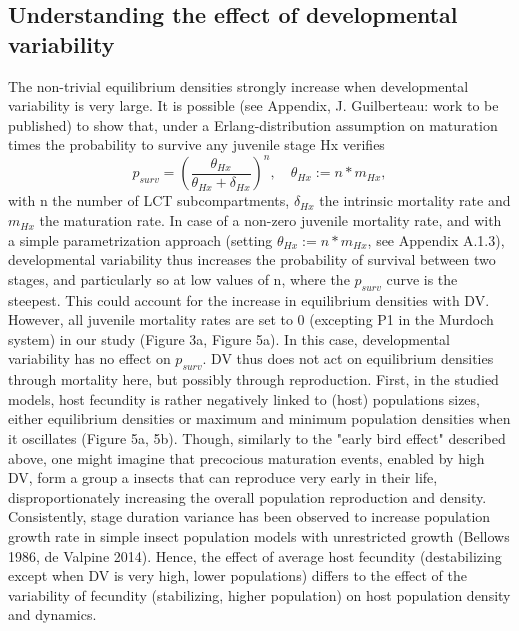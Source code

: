 \documentclass[12pt,a4paper,onecolumn]{article}
\begin{document}
\subsection{Understanding the effect of developmental variability}

\tabto{1 cm} The non-trivial equilibrium densities strongly increase when developmental variability is very large. It is possible (see Appendix, J. Guilberteau: work to be published) to show that, under a Erlang-distribution assumption on maturation times the probability to survive any juvenile stage Hx verifies
\[ p_{surv} = (\frac{\theta_{Hx}}{\theta_{Hx} + \delta_{Hx}})^n, \quad \theta_{Hx} := n*m_{Hx}, \]
with n the number of LCT subcompartments, $\delta_{Hx}$ the intrinsic mortality rate and $m_{Hx}$ the maturation rate. In case of a non-zero juvenile mortality rate, and with a simple parametrization approach (setting $\theta_{Hx} := n*m_{Hx}$, see Appendix A.1.3), developmental variability thus increases the probability of survival between two stages, and particularly so at low values of n, where the $p_{surv}$ curve is the steepest. This could account for the increase in equilibrium densities with DV. However, all juvenile mortality rates are set to 0 (excepting P1 in the Murdoch system) in our study (Figure 3a, Figure 5a). In this case, developmental variability has no effect on $p_{surv}$. DV thus does not act on equilibrium densities through mortality here, but possibly through reproduction. First, in the studied models, host fecundity is rather negatively linked to (host) populations sizes, either equilibrium densities or maximum and minimum population densities when it oscillates (Figure 5a, 5b). Though, similarly to the "early bird effect" described above, one might imagine that precocious maturation events, enabled by high DV, form a group a insects that can reproduce very early in their life, disproportionately increasing the overall population reproduction and density. Consistently, stage duration variance has been observed to increase population growth rate in simple insect population models with unrestricted growth (Bellows 1986, de Valpine 2014). Hence, the effect of average host fecundity (destabilizing except when DV is very high, lower populations) differs to the effect of the variability of fecundity (stabilizing, higher population) on host population density and dynamics. 
\end{document}
